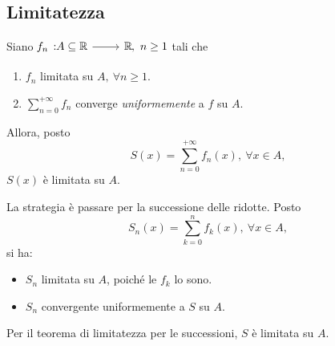 \subsection{Limitatezza}
\begin{theorema}
	Siano $\displaystyle \funz{f_n}{A\subseteq\realset}{\realset},\ n\geq 1$ tali che
	\begin{enumerate}[label=\alph*.]
		\item $f_n$ limitata su $A,\ \forall n\geq 1$.
		\item $\displaystyle\sum_{n=0}^{+\infty}f_n$ converge \textit{uniformemente} a $f$ su $A$.
	\end{enumerate}
	Allora, posto 
	\begin{equation*}
		S(x)=\sum_{n=0}^{+\infty}f_n(x),\ \forall x\in A,
	\end{equation*}
$S(x)$ è limitata su $A$.
\end{theorema}
\begin{demonstration}
	La strategia è passare per la successione delle ridotte. Posto 
	\begin{equation*}
		S_n(x)=\sum_{k=0}^{n}f_k(x),\ \forall x\in A,
	\end{equation*}
	si ha:
	\begin{itemize}
		\item $S_n$ limitata su $A$, poiché le $f_k$ lo sono.
		\item $S_n$ convergente uniformemente a $S$ su $A$.
	\end{itemize}
	Per il teorema di limitatezza per le successioni, $S$ è limitata su $A$.
\end{demonstration}

